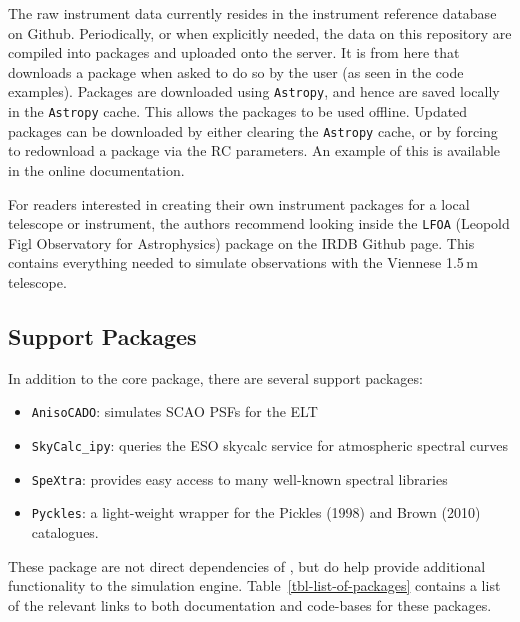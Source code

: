 The raw instrument data currently resides in the instrument reference database on Github.
Periodically, or when explicitly needed, the data on this repository are compiled into packages and uploaded onto the \ScopeSim{} server.
It is from here that \ScopeSim{} downloads a package when asked to do so by the user (as seen in the code examples).
Packages are downloaded using \lstinline{Astropy}, and hence are saved locally in the \lstinline{Astropy} cache.
This allows the packages to be used offline.
Updated packages can be downloaded by either clearing the \lstinline{Astropy} cache, or by forcing \scopesim{} to redownload a package via the RC parameters.
An example of this is available in the online documentation.

For readers interested in creating their own instrument packages for a local telescope or instrument, the authors recommend looking inside the \lstinline{LFOA} (Leopold Figl Observatory for Astrophysics) package on the IRDB Github page.
This contains everything needed to simulate observations with the Viennese 1.5\,m telescope.



\subsection{Support Packages}
\label{support-packages}

In addition to the core package, there are several support packages:

\begin{itemize}
\item \lstinline{AnisoCADO}: simulates SCAO PSFs for the ELT

\item \lstinline{SkyCalc_ipy}: queries the ESO skycalc service for atmospheric spectral curves

\item \lstinline{SpeXtra}: provides easy access to many well-known spectral libraries

\item \lstinline{Pyckles}: a light-weight wrapper for the Pickles (1998) and Brown (2010) catalogues.
\end{itemize}

These package are not direct dependencies of \ScopeSim{}, but do help provide additional functionality to the simulation engine.
Table~\ref{tbl-list-of-packages} contains a list of the relevant links to both documentation and code-bases for these packages.

